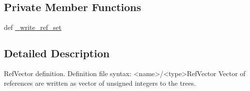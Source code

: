 \subsection*{Private Member Functions}
\begin{DoxyCompactItemize}
\item 
def \hyperlink{classpanda_1_1refvbranch_1_1RefVectorBranch_ac67489054a7af1123de1f57498d6f470}{\_\-write\_\-ref\_\-set}
\end{DoxyCompactItemize}


\subsection{Detailed Description}
\begin{DoxyVerb}
RefVector definition. Definition file syntax:
<name>/<type>RefVector
Vector of references are written as vector of unsigned integers to the trees.
\end{DoxyVerb}
 

